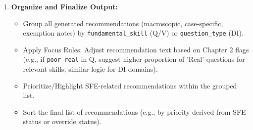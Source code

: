 \documentclass{article}
\begin{document}
\begin{enumerate}
\begin{itemize}
\begin{enumerate}
\begin{itemize}
\begin{itemize}
                            \end{itemize}
                    \end{itemize}
            \end{enumerate}
    \end{itemize}
    \item \textbf{Organize and Finalize Output:}
    \begin{itemize}
        \item Group all generated recommendations (macroscopic, case-specific, exemption notes) by \texttt{fundamental\_skill} (Q/V) or \texttt{question\_type} (DI).
        \item Apply Focus Rules: Adjust recommendation text based on Chapter 2 flags (e.g., if \texttt{poor\_real} in Q, suggest higher proportion of 'Real' questions for relevant skills; similar logic for DI domains).
        \item Prioritize/Highlight SFE-related recommendations within the grouped list.
        \item Sort the final list of recommendations (e.g., by priority derived from SFE status or override status).
    \end{itemize}
\end{enumerate}
\end{document}
